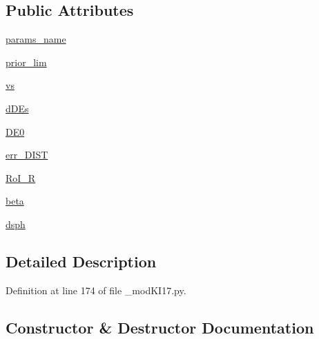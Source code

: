\subsection*{Public Attributes}
\begin{DoxyCompactItemize}
\item 
\hyperlink{class__modKI17_1_1modKI17__memonly_a5dd81ce7c8a80a9c12b9aad4af5b213c}{params\+\_\+name}
\item 
\hyperlink{class__modKI17_1_1modKI17__memonly_aee2e8268d9d80886e7f6cb5b624643b3}{prior\+\_\+lim}
\item 
\hyperlink{class__modKI17_1_1modKI17__memonly_a6a6b262ec1d69137a3f087bbcff279d1}{vs}
\item 
\hyperlink{class__modKI17_1_1modKI17__memonly_a66eadff7c0eba4fe2b238e5aedf98638}{d\+D\+Es}
\item 
\hyperlink{class__modKI17_1_1modKI17__memonly_af444ead6a28421d00384a58f77d065b7}{D\+E0}
\item 
\hyperlink{class__modKI17_1_1modKI17__memonly_a6742061415638b7a8a4b72dad4cda81a}{err\+\_\+\+D\+I\+ST}
\item 
\hyperlink{class__modKI17_1_1modKI17__memonly_a51221703f97275e53ce0d4ce44091e07}{Ro\+I\+\_\+R}
\item 
\hyperlink{class__modKI17_1_1modKI17__memonly_ab9834e8fbb5fba20c559bc2e42ef15b4}{beta}
\item 
\hyperlink{class__modKI17_1_1modKI17__memonly_af1da8b3c53c0ad6761589dac864b920b}{dsph}
\end{DoxyCompactItemize}


\subsection{Detailed Description}


Definition at line 174 of file \+\_\+mod\+K\+I17.\+py.



\subsection{Constructor \& Destructor Documentation}
\mbox{\label{class__modKI17_1_1modKI17__memonly_a55fde9391aab82b0622165fe6c31b5e9}} 
